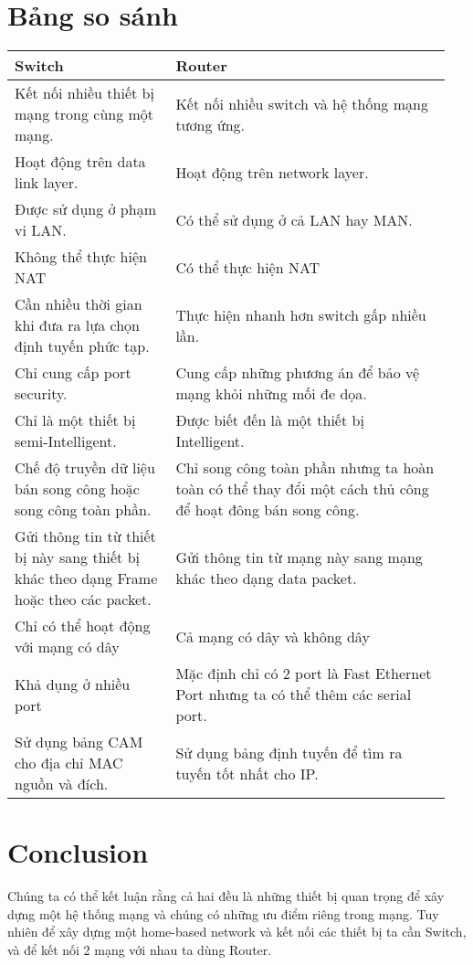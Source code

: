 \documentclass[12pt]{article}
\begin{document}
    \section*{Bảng so sánh}
    \begin{center}
        \begin{tabular}{ p{0.35\linewidth} | p{0.6\linewidth}}
        \hline
        Switch & Router  \\ \hline
        Kết nối nhiều thiết bị mạng trong cùng một mạng. & Kết nối nhiều switch và hệ thống 
        mạng tương ứng. \\ \hline
        Hoạt động trên data link layer. & Hoạt động trên network layer. \\ \hline
        Được sử dụng ở phạm vi LAN. & Có thể sử dụng ở cả LAN hay MAN. \\ \hline
        Không thể thực hiện NAT & Có thể thực hiện NAT \\ \hline
        Cần nhiều thời gian khi đưa ra lựa chọn định tuyến phức tạp. & Thực hiện nhanh hơn switch gấp nhiều lần. \\ \hline
        Chỉ cung cấp port security. & Cung cấp những phương án để bảo vệ mạng khỏi những 
        mối đe dọa. \\ \hline
        Chỉ là một thiết bị semi-Intelligent. & Được biết đến là một thiết bị Intelligent. \\
        \hline
        Chế độ truyền dữ liệu bán song công hoặc song công toàn phần. & Chỉ song công toàn phần nhưng ta hoàn toàn có thể thay đổi một cách 
        thủ công để hoạt đông bán song công. \\ \hline
        Gửi thông tin từ thiết bị này sang thiết bị khác theo dạng Frame hoặc theo
        các packet. & Gửi thông tin từ mạng này sang mạng khác theo dạng data packet. \\ \hline
        Chỉ có thể hoạt động với mạng có dây & Cả mạng có dây và không dây \\ \hline
        Khả dụng ở nhiều port & Mặc định chỉ có 2 port là Fast Ethernet Port nhưng ta có thể thêm các serial port. \\ \hline
        Sử dụng bảng CAM cho địa chỉ MAC nguồn và đích. & Sử dụng bảng định tuyến để tìm ra tuyến tốt nhất cho IP.
        \end{tabular}
    \end{center}

    \section*{Conclusion}
    Chúng ta có thể kết luận rằng cả hai đều là những thiết bị quan trọng
    để xây dựng một hệ thống mạng và chúng có những ưu điểm riêng trong mạng. Tuy nhiên để
    xây dựng một home-based network và kết nối các thiết bị ta cần Switch, và để kết nối 2 mạng với nhau
    ta dùng Router.
    
\end{document}
